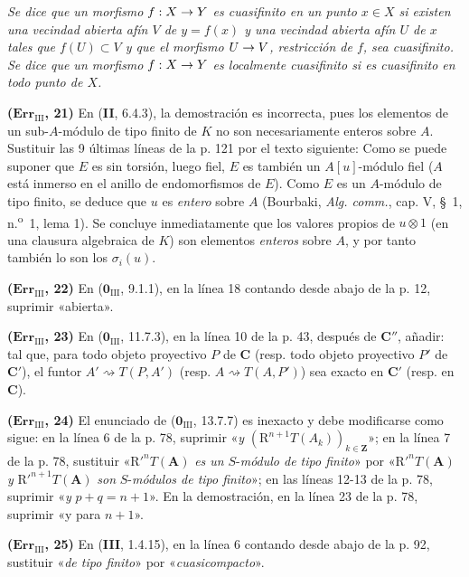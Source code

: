\documentclass[10pt,oneside,openany]{book}
\theoremstyle{egaenv}\newtheorem*{env}{---}
\theoremstyle{egastatement}
\theoremstyle{egadescription}
\renewcommand{\to}{\mathchoice{\longrightarrow}{\rightarrow}{\rightarrow}{\rightarrow}}
\begin{document}
\emph{Se dice que un morfismo $f:X\to Y$ es cuasifinito en un punto $x\in X$
si existen una vecindad abierta afín $V$ de $y=f(x)$ y una vecindad abierta afín
$U$ de $x$ tales que $f(U)\subset V$ y que el morfismo $U\to V$, restricción de
$f$, sea cuasifinito. Se dice que un morfismo $f:X\to Y$ es localmente
cuasifinito si es cuasifinito en todo punto de $X$.}

\noindent\textbf{($\mathbf{Err}_{\mathrm{III}}$, 21)} En (\textbf{II}, 6.4.3), la
demostración es incorrecta, pues los elementos de un sub-$A$-módulo de tipo
finito de $K$ no son necesariamente enteros sobre $A$. Sustituir las 9 últimas
líneas de la p. 121 por el texto siguiente: Como se puede suponer que $E$ es
sin torsión, luego fiel, $E$ es también un $A[u]$-módulo fiel ($A$ está
inmerso en el anillo de endomorfismos de $E$). Como $E$ es un $A$-módulo de
tipo finito, se deduce que $u$ es \emph{entero} sobre $A$ (Bourbaki,
\emph{Alg. comm.}, cap. V, \S~1, n.\textsuperscript{o}~1, lema 1). Se concluye
inmediatamente que los valores propios de $u\otimes1$ (en una clausura
algebraica de $K$) son elementos \emph{enteros} sobre $A$, y por tanto también
lo son los $\sigma_i(u)$.

\noindent\textbf{($\mathbf{Err}_{\mathrm{III}}$, 22)} En
($\mathbf{0}_{\mathrm{III}}$, 9.1.1), en la línea 18 contando desde abajo de la p. 12,
suprimir «abierta».

\noindent\textbf{($\mathbf{Err}_{\mathrm{III}}$, 23)} En
($\mathbf{0}_{\mathrm{III}}$, 11.7.3), en la línea 10 de la p. 43, después de
$\boldsymbol{C}''$, añadir: tal que, para todo objeto proyectivo $P$ de
$\boldsymbol{C}$ (resp. todo objeto proyectivo $P'$ de $\boldsymbol{C}'$),
el funtor $A'\rightsquigarrow T(P,A')$ (resp.
$A\rightsquigarrow T(A,P')$) sea exacto en $\boldsymbol{C}'$ (resp. en
$\boldsymbol{C}$).

\noindent\textbf{($\mathbf{Err}_{\mathrm{III}}$, 24)} El enunciado de
($\mathbf{0}_{\mathrm{III}}$, 13.7.7) es inexacto y debe modificarse como sigue: en la
línea 6 de la p. 78, suprimir «\emph{y}
$(\mathrm R^{n+1}T(A_k))_{k\in\mathbf Z}$»; en la línea 7 de la p. 78, sustituir
«$\mathrm R'^nT(\mathbf A)$ \emph{es un} $S$-\emph{módulo de tipo finito}» por
«$\mathrm R'^nT(\mathbf A)$ \emph{y} $\mathrm R'^{n+1}T(\mathbf A)$ \emph{son} $S$-\emph{módulos de tipo finito}»;
en las líneas 12-13 de la p. 78, suprimir «\emph{y} $p+q=n+1$». En la demostración,
en la línea 23 de la p. 78, suprimir «y para $n+1$».

\noindent\textbf{($\mathbf{Err}_{\mathrm{III}}$, 25)} En (\textbf{III}, 1.4.15), en
la línea 6 contando desde abajo de la p. 92, sustituir «\emph{de tipo finito}»
por «\emph{cuasicompacto}».
\end{document}
